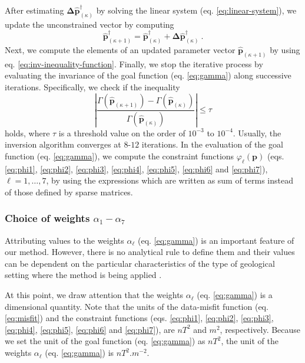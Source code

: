 After estimating $\boldsymbol{\Delta} \hat{\mathbf{p}}^{\dagger}_{(\kappa)}$ by 
solving the linear system (eq. \ref{eq:linear-system}), we update the unconstrained 
vector by computing
\begin{equation}\label{eq:p-k1-dagger}
\hat{\mathbf{p}}^{\dagger}_{(\kappa + 1)} =
\hat{\mathbf{p}}^{\dagger}_{(\kappa)} +
\boldsymbol{\Delta} \hat{\mathbf{p}}^{\dagger}_{(\kappa)} \: .
\end{equation}
Next, we compute the elements of an updated parameter vector $\hat{\mathbf{p}}_{(\kappa + 1)}$ by using eq. \ref{eq:inv-inequality-function}.
Finally, we stop the iterative process by evaluating the invariance of the 
goal function (eq. \ref{eq:gamma}) along successive iterations.
Specifically, we check if the inequality
\begin{equation}\label{eq:stop-criterion}
 \left| \frac{\Gamma (\hat{\mathbf{p}}_{(\kappa +1)}) - 
 \Gamma (\hat{\mathbf{p}}_{(\kappa)})}
 {\Gamma (\hat{\mathbf{p}}_{(\kappa)})} 
 \right| \le \tau
\end{equation}
holds, where $\tau$ is a threshold value on the order of $10^{-3}$ to $10^{-4}$. 
Usually, the inversion algorithm converges at $8$-$12$ iterations.
In the evaluation of the goal function (eq. \ref{eq:gamma}), we compute the 
constraint functions $\varphi_{\ell}(\mathbf{p})$ (eqs. \ref{eq:phi1}, \ref{eq:phi2},
\ref{eq:phi3}, \ref{eq:phi4}, \ref{eq:phi5}, \ref{eq:phi6} and \ref{eq:phi7}), 
$\ell = 1, \dots, 7$, by using the expressions which are written as sum of 
terms instead of those defined by sparse matrices.


\subsubsection{Choice of weights $\alpha_{1}-\alpha_{7}$}

Attributing values to the weights $ \alpha_{\ell} $ (eq. \ref{eq:gamma}) is an important feature of our method. 
However, there is no analytical rule to define them and their values can be dependent on the particular characteristics of the type of geological setting where the method is being applied \cite[]{silva-2001}. 

At this point, we draw attention that the weights $ \alpha_{\ell}$ (eq. \ref{eq:gamma}) is a dimensional 
quantity. 
Note that the units of the data-misfit function (eq. \ref{eq:misfit}) and the constraint functions 
(eqs. \ref{eq:phi1}, \ref{eq:phi2}, \ref{eq:phi3}, \ref{eq:phi4}, \ref{eq:phi5}, 
\ref{eq:phi6} and \ref{eq:phi7}), are $nT^{2}$ and $m^{2}$, respectively.
Because we set the unit of the goal function (eq. \ref{eq:gamma}) as $nT^{2}$, the unit of the weights 
$ \alpha_{\ell} $ (eq. \ref{eq:gamma}) is $nT^{2}.m^{-2}$.

